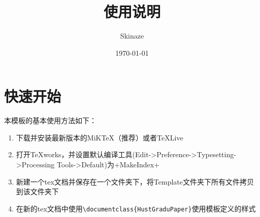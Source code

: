 \documentclass[UTF8]{ctexart}
\title{使用说明}
\author{Skinaze}
\date{\today}
\begin{document}
	\maketitle
	\section{快速开始}
	本模板的基本使用方法如下：
	\begin{enumerate}
		\item 下载并安装最新版本的MiK\TeX （推荐）或者\TeX\space Live\\
		\item 打开\TeX works，并设置默认编译工具(Edit->Preference->Typesetting->Processing Tools->Default)为\XeLaTeX+MakeIndex+\BibTeX\\
		\item 新建一个tex文档并保存在一个文件夹下，将Template文件夹下所有文件拷贝到该文件夹下\\
		\item 在新的tex文档中使用\verb|\documentclass{HustGraduPaper}|使用模板定义的样式
	\end{enumerate}
\end{document}
